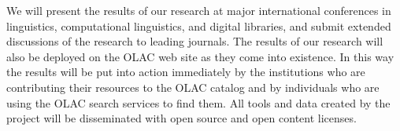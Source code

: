 We will present the results of our research at major international
conferences in linguistics, computational linguistics, and
digital libraries, and submit extended discussions of the research to
leading journals.  The results of our research will also be deployed
on the OLAC web site as they come into existence. In this way the
results will be put into action immediately by the institutions
who are contributing their resources to the OLAC catalog and by 
individuals who are using the OLAC search services to find them.
All tools and data created by the project will be
disseminated with open source and open content licenses. 

